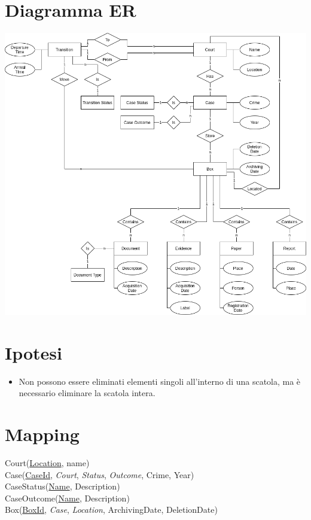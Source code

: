 \documentclass{article}
\begin{document}
\section{Diagramma ER}

\begin{adjustwidth}{-50cm}{-50cm}
    \vspace{\fill}
    \begin{center}
        \includegraphics[scale=0.50]{../images/er.png}
    \end{center}
    \vspace{\fill}
\end{adjustwidth}

\newpage
\section{Ipotesi}

\begin{itemize}
    \item Non possono essere eliminati elementi singoli all'interno di una scatola, ma è necessario eliminare la scatola intera.
\end{itemize}

\section{Mapping}

Court(\underline{Location}, name) \\
Case(\underline{CaseId}, \textit{Court}, \textit{Status}, \textit{Outcome}, Crime, Year) \\
CaseStatus(\underline{Name}, Description) \\
CaseOutcome(\underline{Name}, Description) \\
Box(\underline{BoxId}, \textit{Case}, \textit{Location}, ArchivingDate, DeletionDate)
\end{document}
